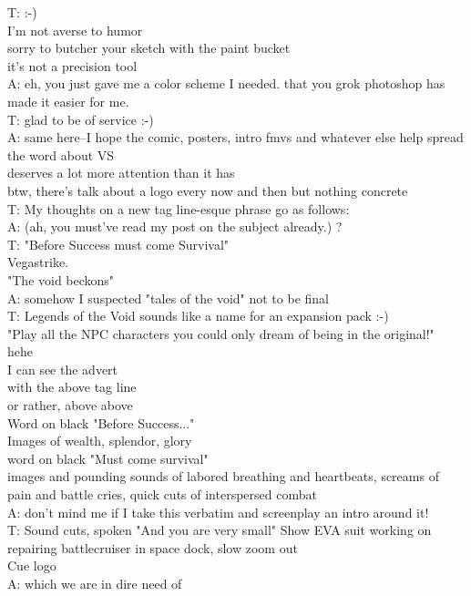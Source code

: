 T: :-)\\
I'm not averse to humor\\
sorry to butcher your sketch with the paint bucket\\
it's not a precision tool\\
A: eh, you just gave me a color scheme I needed. that you grok photoshop has made it easier for me.\\
T: glad to be of service :-)\\
A: same here--I hope the comic, posters, intro fmvs and whatever else help spread the word about VS\\
deserves a lot more attention than it has\\
 btw, there's talk about a logo every now and then but nothing concrete\\
T: My thoughts on a new tag line-esque phrase go as follows:\\
A: (ah, you must've read my post on the subject already.) ?\\
T: "Before Success must come Survival"\\
Vegastrike.\\
"The void beckons"\\
A: somehow I suspected "tales of the void" not to be final\\
T: Legends of the Void sounds like a name for an expansion pack :-)\\
"Play all the NPC characters you could only dream of being in the original!"\\
hehe\\
I can see the advert \\
with the above tag line\\
or rather, above above\\
Word on black "Before Success..."\\
Images of wealth, splendor, glory\\
word on black "Must come survival"\\
images and pounding sounds of labored breathing and heartbeats, screams of pain and battle cries, quick cuts of interspersed combat\\
A: don't mind me if I take this verbatim and screenplay an intro around it!\\
T: Sound cuts, spoken "And you are very small" Show EVA suit working on repairing battlecruiser in space dock, slow zoom out\\
Cue logo \\
A: which we are in dire need of\\
